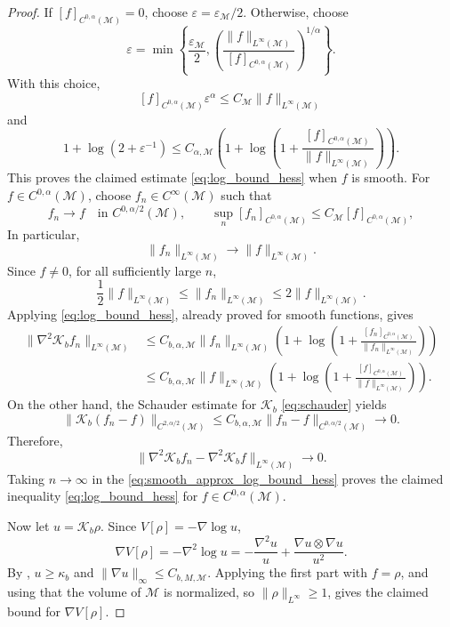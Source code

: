 \documentclass[11pt]{article}
\theoremstyle{definition}
\def\K{\mathcal K}
\def\M{\mathcal M}
\begin{document}
\begin{proof}
If \([f]_{C^{0,\alpha}(\M)}=0\), choose
\(\varepsilon=\varepsilon_{\M}/2\). Otherwise, choose
\[
\varepsilon
=
\min\left\{
\frac{\varepsilon_{\M}}2,
\left(
\frac{\|f\|_{L^\infty(\M)}}
{[f]_{C^{0,\alpha}(\M)}}
\right)^{1/\alpha}
\right\}.
\]
With this choice,
\[
[f]_{C^{0,\alpha}(\M)}\varepsilon^\alpha
\le
C_{\M}\|f\|_{L^\infty(\M)}
\]
and
\[
1+\log(2+\varepsilon^{-1})
\le
C_{\alpha,\M}
\left(
1+\log\left(
1+
\frac{[f]_{C^{0,\alpha}(\M)}}
{\|f\|_{L^\infty(\M)}}
\right)
\right).
\]
This proves the claimed estimate \eqref{eq:log_bound_hess} when \(f\) is smooth.
For \(f\in C^{0,\alpha}(\M)\), choose \(f_n\in C^\infty(\M)\) such that
\[
f_n\longrightarrow f
\quad\text{in }C^{0,\alpha/2}(\M),
\qquad
\sup_n [f_n]_{C^{0,\alpha}(\M)}
\le C_{\M}[f]_{C^{0,\alpha}(\M)},
\]
In particular,
\[
\|f_n\|_{L^\infty(\M)}
\longrightarrow
\|f\|_{L^\infty(\M)}.
\]
Since \(f\neq0\), for all sufficiently large \(n\),
\[
\frac12\|f\|_{L^\infty(\M)}
\le
\|f_n\|_{L^\infty(\M)}
\le
2\|f\|_{L^\infty(\M)}.
\]
Applying \eqref{eq:log_bound_hess}, already proved for smooth functions, gives
\begin{equation}
\label{eq:smooth_approx_log_bound_hess}
\begin{aligned}
\|\nabla^2\mathcal K_bf_n\|_{L^\infty(\M)}
&\le
C_{b,\alpha,\M}\|f_n\|_{L^\infty(\M)}
\left(
1+\log\left(
1+
\frac{[f_n]_{C^{0,\alpha}(\M)}}
{\|f_n\|_{L^\infty(\M)}}
\right)
\right)\\
&\le
C_{b,\alpha,\M}\|f\|_{L^\infty(\M)}
\left(
1+\log\left(
1+
\frac{[f]_{C^{0,\alpha}(\M)}}
{\|f\|_{L^\infty(\M)}}
\right)
\right).
\end{aligned}
\end{equation}
On the other hand, the Schauder estimate for
\(\K_b\) \eqref{eq:schauder} yields
\[
\|\mathcal K_b(f_n-f)\|_{C^{2,\alpha/2}(\M)}
\le
C_{b,\alpha,\M}
\|f_n-f\|_{C^{0,\alpha/2}(\M)}
\longrightarrow0.
\]
Therefore,
\[
\|\nabla^2\mathcal K_bf_n-\nabla^2\mathcal K_bf\|_{L^\infty(\M)}
\longrightarrow0.
\]
Taking \(n\to\infty\) in the \eqref{eq:smooth_approx_log_bound_hess} proves the claimed
inequality \eqref{eq:log_bound_hess} for \(f\in C^{0,\alpha}(\M)\).


Now let \(u=\mathcal K_b\rho\). Since \(V[\rho]=-\nabla\log u\),
\[
\nabla V[\rho]
=-\nabla^2\log u
=-\frac{\nabla^2u}{u}
+\frac{\nabla u\otimes\nabla u}{u^2}.
\]
By , \(u\ge\kappa_b\) and
\(\|\nabla u\|_\infty\le C_{b,M,\M}\). Applying the first part with \(f=\rho\),
and using that the volume of \(\M\) is normalized, so
\(\|\rho\|_{L^\infty}\ge1\), gives the
claimed bound for \(\nabla V[\rho]\).
\end{proof}
\end{document}
